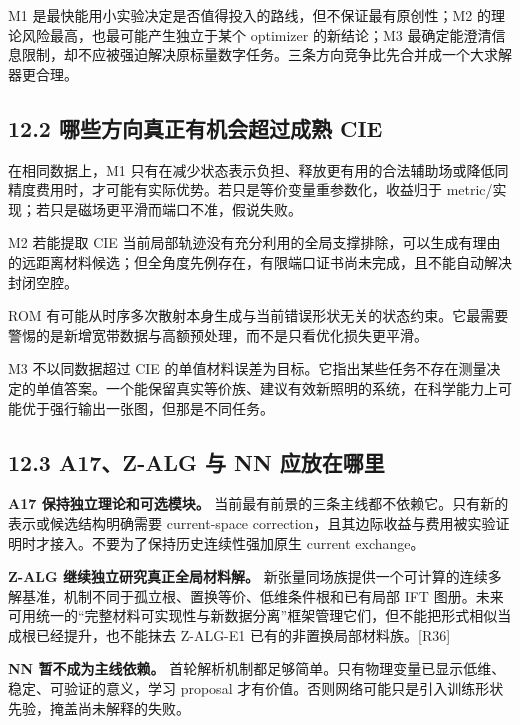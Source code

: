 \documentclass[11pt,a4paper]{article}
\begin{document}
M1 是最快能用小实验决定是否值得投入的路线，但不保证最有原创性；M2
的理论风险最高，也最可能产生独立于某个 optimizer 的新结论；M3
最确定能澄清信息限制，却不应被强迫解决原标量数字任务。三条方向竞争比先合并成一个大求解器更合理。

\hypertarget{ux54eaux4e9bux65b9ux5411ux771fux6b63ux6709ux673aux4f1aux8d85ux8fc7ux6210ux719f-cie}{%
\subsection{12.2 哪些方向真正有机会超过成熟
CIE}\label{ux54eaux4e9bux65b9ux5411ux771fux6b63ux6709ux673aux4f1aux8d85ux8fc7ux6210ux719f-cie}}

在相同数据上，M1
只有在减少状态表示负担、释放更有用的合法辅助场或降低同精度费用时，才可能有实际优势。若只是等价变量重参数化，收益归于
metric/实现；若只是磁场更平滑而端口不准，假说失败。

M2 若能提取 CIE
当前局部轨迹没有充分利用的全局支撑排除，可以生成有理由的远距离材料候选；但全角度先例存在，有限端口证书尚未完成，且不能自动解决封闭空腔。

ROM
有可能从时序多次散射本身生成与当前错误形状无关的状态约束。它最需要警惕的是新增宽带数据与高额预处理，而不是只看优化损失更平滑。

M3 不以同数据超过 CIE
的单值材料误差为目标。它指出某些任务不存在测量决定的单值答案。一个能保留真实等价族、建议有效新照明的系统，在科学能力上可能优于强行输出一张图，但那是不同任务。

\hypertarget{a17z-alg-ux4e0e-nn-ux5e94ux653eux5728ux54eaux91cc}{%
\subsection{12.3 A17、Z-ALG 与 NN
应放在哪里}\label{a17z-alg-ux4e0e-nn-ux5e94ux653eux5728ux54eaux91cc}}

\textbf{A17 保持独立理论和可选模块。}
当前最有前景的三条主线都不依赖它。只有新的表示或候选结构明确需要
current-space
correction，且其边际收益与费用被实验证明时才接入。不要为了保持历史连续性强加原生
current exchange。

\textbf{Z-ALG 继续独立研究真正全局材料解。}
新张量同场族提供一个可计算的连续多解基准，机制不同于孤立根、置换等价、低维条件根和已有局部
IFT
图册。未来可用统一的``完整材料可实现性与新数据分离''框架管理它们，但不能把形式相似当成根已经提升，也不能抹去
Z-ALG-E1 已有的非置换局部材料族。{[}R36{]}

\textbf{NN 暂不成为主线依赖。}
首轮解析机制都足够简单。只有物理变量已显示低维、稳定、可验证的意义，学习
proposal
才有价值。否则网络可能只是引入训练形状先验，掩盖尚未解释的失败。
\end{document}
